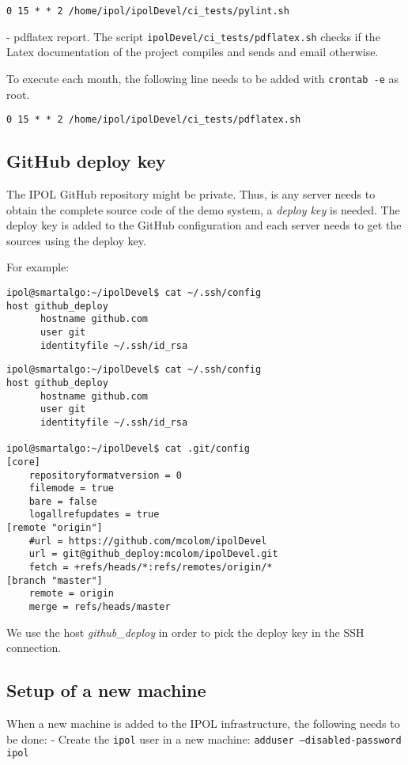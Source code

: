 \documentclass[a4paper,12pt]{article}
\begin{document}
{\tt 0 15 * * 2 /home/ipol/ipolDevel/ci\_tests/pylint.sh}

- pdflatex report. The script {\tt ipolDevel/ci\_tests/pdflatex.sh} checks if the Latex documentation of the project compiles and sends and email otherwise.

To execute each month, the following line needs to be added with {\tt crontab -e} as root.

{\tt 0 15 * * 2 /home/ipol/ipolDevel/ci\_tests/pdflatex.sh}



\subsection{GitHub deploy key}
The IPOL GitHub repository might be private. Thus, is any server needs to obtain the complete source code of the demo system, a \emph{deploy key} is needed. The deploy key is added to the GitHub configuration and each server needs to get the sources using the deploy key.

For example:

\begin{verbatim}
ipol@smartalgo:~/ipolDevel$ cat ~/.ssh/config 
host github_deploy
      hostname github.com
      user git
      identityfile ~/.ssh/id_rsa
\end{verbatim}

\vspace{0.15cm}

\begin{verbatim}
ipol@smartalgo:~/ipolDevel$ cat ~/.ssh/config 
host github_deploy
      hostname github.com
      user git
      identityfile ~/.ssh/id_rsa

ipol@smartalgo:~/ipolDevel$ cat .git/config 
[core]
	repositoryformatversion = 0
	filemode = true
	bare = false
	logallrefupdates = true
[remote "origin"]
	#url = https://github.com/mcolom/ipolDevel
	url = git@github_deploy:mcolom/ipolDevel.git
	fetch = +refs/heads/*:refs/remotes/origin/*
[branch "master"]
	remote = origin
	merge = refs/heads/master
\end{verbatim}

We use the host \emph{github\_deploy} in order to pick the deploy key in the SSH connection.

\subsection{Setup of a new machine}
When a new machine is added to the IPOL infrastructure, the following needs to be done:
- Create the {\tt ipol} user in a new machine: {\tt adduser --disabled-password ipol}
\end{document}

